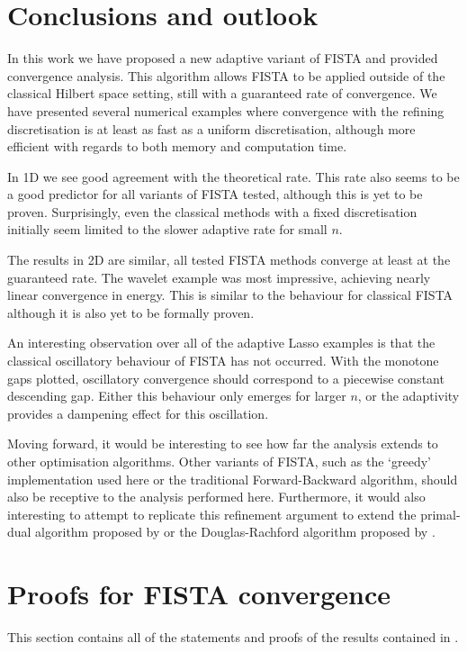 \documentclass[10pt,a4paper,onecolumn]{article}
\numberwithin{equation}{section}
\begin{document}
\section{Conclusions and outlook}
In this work we have proposed a new adaptive variant of FISTA and provided convergence analysis. This algorithm allows FISTA to be applied outside of the classical Hilbert space setting, still with a guaranteed rate of convergence. We have presented several numerical examples where convergence with the refining discretisation is at least as fast as a uniform discretisation, although more efficient with regards to both memory and computation time. 

In 1D we see good agreement with the theoretical rate. This rate also seems to be a good predictor for all variants of FISTA tested, although this is yet to be proven. Surprisingly, even the classical methods with a fixed discretisation initially seem limited to the slower adaptive rate for small $n$.

The results in 2D are similar, all tested FISTA methods converge at least at the guaranteed rate. The wavelet example was most impressive, achieving nearly linear convergence in energy. This is similar to the behaviour for classical FISTA although it is also yet to be formally proven.

An interesting observation over all of the adaptive Lasso examples is that the classical oscillatory behaviour of FISTA has not occurred. With the monotone gaps plotted, oscillatory convergence should correspond to a piecewise constant descending gap. Either this behaviour only emerges for larger $n$, or the adaptivity provides a dampening effect for this oscillation.

Moving forward, it would be interesting to see how far the analysis extends to other optimisation algorithms. Other variants of FISTA, such as the `greedy' implementation used here or the traditional Forward-Backward algorithm, should also be receptive to the analysis performed here. Furthermore, it would also interesting to attempt to replicate this refinement argument to extend the primal-dual algorithm proposed by \citet{Chambolle2011} or the Douglas-Rachford algorithm proposed by \citet{Douglas1956}.

\appendix
\section{Proofs for FISTA convergence}\label{app: FISTA convergence}
This section contains all of the statements and proofs of the results contained in .
\end{document}

